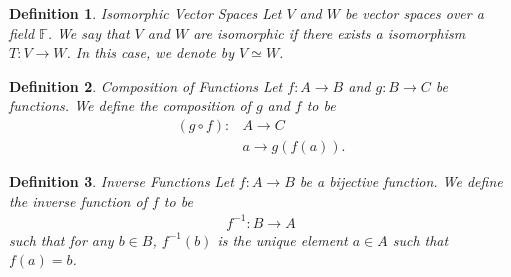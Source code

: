 \documentclass[12pt,answers]{exam}
\newcommand{\F}{\mathbb{F}}
\newtheorem{definition}{Definition}[section]
\begin{document}
\begin{definition}{Isomorphic Vector Spaces}
Let $V$ and $W$ be vector spaces over a field $\F$. We say that $V$ and $W$ are isomorphic if there exists a isomorphism $T:V\rightarrow W$. In this case, we denote by $V\simeq W$. 
\end{definition}

\begin{definition}{Composition of Functions}
Let $f:A\rightarrow B$ and $g:B\rightarrow C$ be functions. We define the composition of $g$ and $f$ to be
\begin{align*}
	(g\circ f):&A\rightarrow C \\
	& a \rightarrow g(f(a)).
\end{align*}
\end{definition}

\begin{definition}{Inverse Functions}
Let $f:A\rightarrow B$ be a bijective function. We define the inverse function of $f$ to be
\begin{align*}
	f^{-1}:B\rightarrow A
\end{align*} such that for any $b\in B$, $f^{-1}(b)$ is the unique element $a\in A$ such that $f(a)=b$.
\end{definition}
\end{document}
